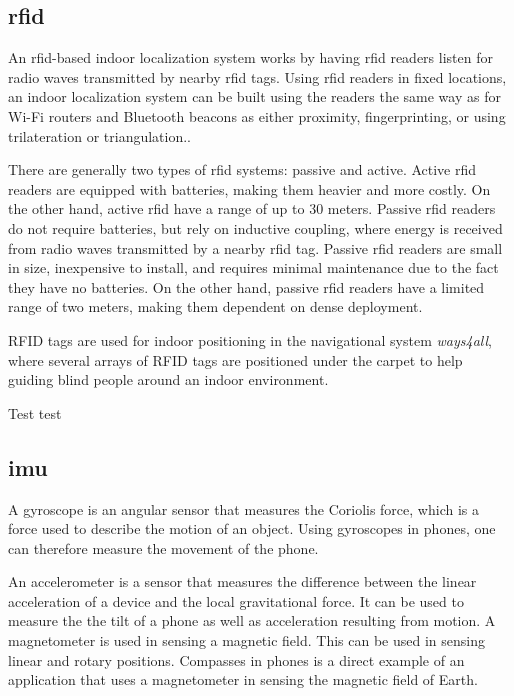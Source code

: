 \subsection{\gls{rfid}}
An \gls{rfid}-based indoor localization system works by having \gls{rfid} readers listen for radio waves transmitted by nearby \gls{rfid} tags. Using \gls{rfid} readers in fixed locations, an indoor localization system can be built using the readers the same way as for Wi-Fi routers and Bluetooth beacons as either proximity, fingerprinting, or using trilateration or triangulation.\cite{HabilitationThesis}.

There are generally two types of \gls{rfid} systems: passive and active. Active \gls{rfid} readers are equipped with batteries, making them heavier and more costly. On the other hand, active \gls{rfid} have a range of up to 30 meters. Passive \gls{rfid} readers do not require batteries, but rely on inductive coupling, where energy is received from radio waves transmitted by a nearby \gls{rfid} tag. Passive \gls{rfid} readers are small in size, inexpensive to install, and requires minimal maintenance due to the fact they have no batteries. On the other hand, passive \gls{rfid} readers have a limited range of two meters, making them dependent on dense deployment.

RFID tags are used for indoor positioning in the navigational system \textit{ways4all}, where several arrays of RFID tags are positioned under the carpet to help guiding blind people around an indoor environment\cite{HabilitationThesis}.

Test test
\subsection{\gls{imu}}
A gyroscope is an angular sensor that measures the Coriolis force, which is a force used to describe the motion of an object\cite{Gyroscope}. Using gyroscopes in phones, one can therefore measure the movement of the phone.

An accelerometer is a sensor that measures the difference between the linear acceleration of a device and the local gravitational force\cite{Accelerometer}. It can be used to measure the the tilt of a phone as well as acceleration resulting from motion\cite{Accelerometer2}.
A magnetometer is used in sensing a magnetic field. This can be used in sensing linear and rotary positions. Compasses in phones is a direct example of an application that uses a magnetometer in sensing the magnetic field of Earth.\cite{Magnetometer}

